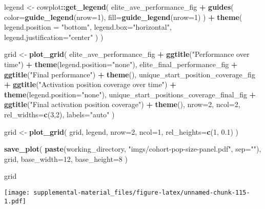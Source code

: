 \documentclass[]{book}
\newenvironment{Shaded}{\begin{snugshade}}{\end{snugshade}}
\newcommand{\DataTypeTok}[1]{\textcolor[rgb]{0.13,0.29,0.53}{#1}}
\newcommand{\DecValTok}[1]{\textcolor[rgb]{0.00,0.00,0.81}{#1}}
\newcommand{\FloatTok}[1]{\textcolor[rgb]{0.00,0.00,0.81}{#1}}
\newcommand{\KeywordTok}[1]{\textcolor[rgb]{0.13,0.29,0.53}{\textbf{#1}}}
\newcommand{\NormalTok}[1]{#1}
\newcommand{\OperatorTok}[1]{\textcolor[rgb]{0.81,0.36,0.00}{\textbf{#1}}}
\newcommand{\StringTok}[1]{\textcolor[rgb]{0.31,0.60,0.02}{#1}}
\begin{document}
\begin{Shaded}
\begin{Highlighting}[]
\NormalTok{legend <-}\StringTok{ }\NormalTok{cowplot}\OperatorTok{::}\KeywordTok{get_legend}\NormalTok{(}
\NormalTok{    elite_ave_performance_fig }\OperatorTok{+}
\StringTok{      }\KeywordTok{guides}\NormalTok{(}
        \DataTypeTok{color=}\KeywordTok{guide_legend}\NormalTok{(}\DataTypeTok{nrow=}\DecValTok{1}\NormalTok{),}
        \DataTypeTok{fill=}\KeywordTok{guide_legend}\NormalTok{(}\DataTypeTok{nrow=}\DecValTok{1}\NormalTok{)}
\NormalTok{      ) }\OperatorTok{+}
\StringTok{      }\KeywordTok{theme}\NormalTok{(}
        \DataTypeTok{legend.position =} \StringTok{"bottom"}\NormalTok{,}
        \DataTypeTok{legend.box=}\StringTok{"horizontal"}\NormalTok{,}
        \DataTypeTok{legend.justification=}\StringTok{"center"}
\NormalTok{      )}
\NormalTok{  )}

\NormalTok{grid <-}\StringTok{ }\KeywordTok{plot_grid}\NormalTok{(}
\NormalTok{  elite_ave_performance_fig }\OperatorTok{+}
\StringTok{    }\KeywordTok{ggtitle}\NormalTok{(}\StringTok{"Performance over time"}\NormalTok{) }\OperatorTok{+}
\StringTok{    }\KeywordTok{theme}\NormalTok{(}\DataTypeTok{legend.position=}\StringTok{"none"}\NormalTok{),}
\NormalTok{  elite_final_performance_fig }\OperatorTok{+}
\StringTok{    }\KeywordTok{ggtitle}\NormalTok{(}\StringTok{"Final performance"}\NormalTok{) }\OperatorTok{+}
\StringTok{    }\KeywordTok{theme}\NormalTok{(),}
\NormalTok{  unique_start_position_coverage_fig }\OperatorTok{+}
\StringTok{    }\KeywordTok{ggtitle}\NormalTok{(}\StringTok{"Activation position coverage over time"}\NormalTok{) }\OperatorTok{+}
\StringTok{    }\KeywordTok{theme}\NormalTok{(}\DataTypeTok{legend.position=}\StringTok{"none"}\NormalTok{),}
\NormalTok{  unique_start_positions_coverage_final_fig }\OperatorTok{+}
\StringTok{    }\KeywordTok{ggtitle}\NormalTok{(}\StringTok{"Final activation position coverage"}\NormalTok{) }\OperatorTok{+}
\StringTok{    }\KeywordTok{theme}\NormalTok{(),}
  \DataTypeTok{nrow=}\DecValTok{2}\NormalTok{,}
  \DataTypeTok{ncol=}\DecValTok{2}\NormalTok{,}
  \DataTypeTok{rel_widths=}\KeywordTok{c}\NormalTok{(}\DecValTok{3}\NormalTok{,}\DecValTok{2}\NormalTok{),}
  \DataTypeTok{labels=}\StringTok{"auto"}
\NormalTok{)}

\NormalTok{grid <-}\StringTok{ }\KeywordTok{plot_grid}\NormalTok{(}
\NormalTok{  grid,}
\NormalTok{  legend,}
  \DataTypeTok{nrow=}\DecValTok{2}\NormalTok{,}
  \DataTypeTok{ncol=}\DecValTok{1}\NormalTok{,}
  \DataTypeTok{rel_heights=}\KeywordTok{c}\NormalTok{(}\DecValTok{1}\NormalTok{, }\FloatTok{0.1}\NormalTok{)}
\NormalTok{)}

\KeywordTok{save_plot}\NormalTok{(}
  \KeywordTok{paste}\NormalTok{(working_directory, }\StringTok{"imgs/cohort-pop-size-panel.pdf"}\NormalTok{, }\DataTypeTok{sep=}\StringTok{""}\NormalTok{),}
\NormalTok{  grid,}
  \DataTypeTok{base_width=}\DecValTok{12}\NormalTok{,}
  \DataTypeTok{base_height=}\DecValTok{8}
\NormalTok{)}

\NormalTok{grid}
\end{Highlighting}
\end{Shaded}

\texttt{[image: supplemental-material\_files/figure-latex/unnamed-chunk-115-1.pdf]}


\end{document}
